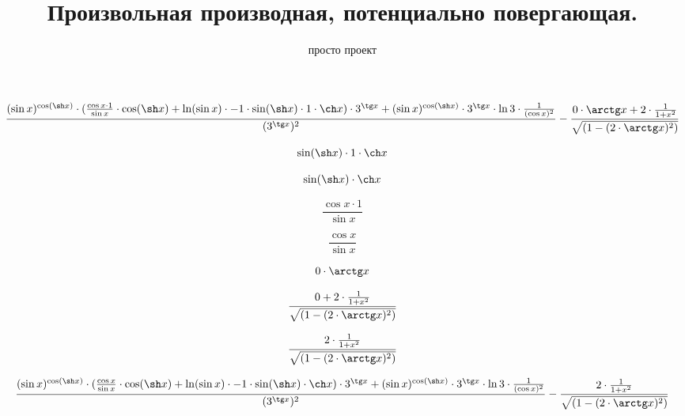 \documentclass[a4paper,12pt]{article}
\title{Произвольная производная, потенциально повергающая.}
\author{просто проект}
\begin{document}
\maketitle

$$ \frac{( \sin x)^{ \cos ( \sh x)} \cdot ( \frac{ \cos x \cdot 1}{ \sin x}  \cdot  \cos ( \sh x)+ \ln ( \sin x) \cdot -1 \cdot  \sin ( \sh x) \cdot 1 \cdot  \ch x) \cdot 3^{ \tg x}+( \sin x)^{ \cos ( \sh x)} \cdot 3^{ \tg x} \cdot  \ln 3 \cdot  \frac{1}{( \cos x)^{2}} }{(3^{ \tg x})^{2}} - \frac{0 \cdot  \arctg x+2 \cdot  \frac{1}{1+x^{2}} }{ \sqrt{(1-(2 \cdot  \arctg x)^{2})}} $$

$$ \sin ( \sh x) \cdot 1 \cdot  \ch x$$

$$ \sin ( \sh x) \cdot  \ch x$$

$$ \frac{ \cos x \cdot 1}{ \sin x} $$

$$ \frac{ \cos x}{ \sin x} $$

$$0 \cdot  \arctg x$$

$$ \frac{0+2 \cdot  \frac{1}{1+x^{2}} }{ \sqrt{(1-(2 \cdot  \arctg x)^{2})}} $$

$$ \frac{2 \cdot  \frac{1}{1+x^{2}} }{ \sqrt{(1-(2 \cdot  \arctg x)^{2})}} $$

$$ \frac{( \sin x)^{ \cos ( \sh x)} \cdot ( \frac{ \cos x}{ \sin x}  \cdot  \cos ( \sh x)+ \ln ( \sin x) \cdot -1 \cdot  \sin ( \sh x) \cdot  \ch x) \cdot 3^{ \tg x}+( \sin x)^{ \cos ( \sh x)} \cdot 3^{ \tg x} \cdot  \ln 3 \cdot  \frac{1}{( \cos x)^{2}} }{(3^{ \tg x})^{2}} - \frac{2 \cdot  \frac{1}{1+x^{2}} }{ \sqrt{(1-(2 \cdot  \arctg x)^{2})}} $$
\end{document}
